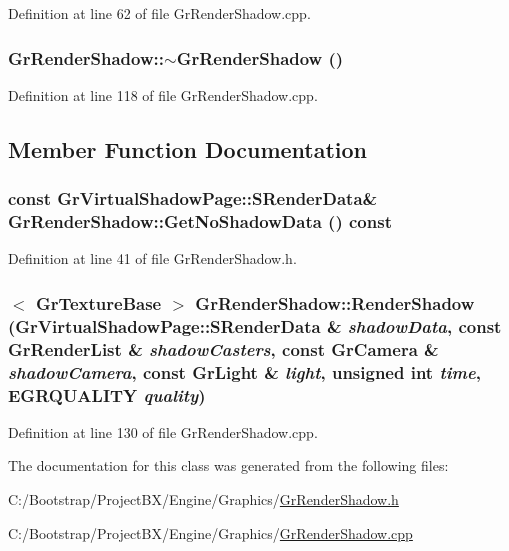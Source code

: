 Definition at line 62 of file GrRenderShadow.cpp.\hypertarget{class_gr_render_shadow_ebc5b2d3b47785bd1d08f2626a7c9a2e}{
\subsubsection[{$\sim$GrRenderShadow}]{\setlength{\rightskip}{0pt plus 5cm}GrRenderShadow::$\sim$GrRenderShadow ()}}
\label{class_gr_render_shadow_ebc5b2d3b47785bd1d08f2626a7c9a2e}




Definition at line 118 of file GrRenderShadow.cpp.

\subsection{Member Function Documentation}
\hypertarget{class_gr_render_shadow_836cfd49a9e481c14049afb1fc7e3165}{
\subsubsection[{GetNoShadowData}]{\setlength{\rightskip}{0pt plus 5cm}const {\bf GrVirtualShadowPage::SRenderData}\& GrRenderShadow::GetNoShadowData () const}}
\label{class_gr_render_shadow_836cfd49a9e481c14049afb1fc7e3165}




Definition at line 41 of file GrRenderShadow.h.\hypertarget{class_gr_render_shadow_96026faa3feecbc650de41111af57c28}{
\subsubsection[{RenderShadow}]{$<$ {\bf GrTextureBase} $>$ GrRenderShadow::RenderShadow ({\bf GrVirtualShadowPage::SRenderData} \& {\em shadowData}, \/  const {\bf GrRenderList} \& {\em shadowCasters}, \/  const {\bf GrCamera} \& {\em shadowCamera}, \/  const {\bf GrLight} \& {\em light}, \/  unsigned int {\em time}, \/  {\bf EGRQUALITY} {\em quality})}}
\label{class_gr_render_shadow_96026faa3feecbc650de41111af57c28}




Definition at line 130 of file GrRenderShadow.cpp.

The documentation for this class was generated from the following files:\begin{CompactItemize}
\item 
C:/Bootstrap/ProjectBX/Engine/Graphics/\hyperlink{_gr_render_shadow_8h}{GrRenderShadow.h}\item 
C:/Bootstrap/ProjectBX/Engine/Graphics/\hyperlink{_gr_render_shadow_8cpp}{GrRenderShadow.cpp}\end{CompactItemize}
